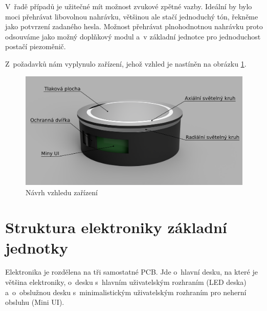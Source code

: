 V~řadě případů je užitečné mít možnost zvukové zpětné vazby.
Ideální by bylo moci přehrávat libovolnou nahrávku, většinou ale stačí jednoduchý tón, řekněme jako potvrzení zadaného hesla.
Možnost přehrávat plnohodnotnou nahrávku proto odsouváme jako možný doplňkový modul a~v základní jednotce pro jednoduchost postačí piezoměnič.

Z~požadavků nám vyplynulo zařízení, jehož vzhled je nastíněn na obrázku \ref{fig:AHS-nacrt}.
\begin{figure}
    \centering
    \includegraphics[width=\textwidth]{text/PraktickaCast/img/AHS-nacrt.png}
    \caption{Návrh vzhledu zařízení}
    \label{fig:AHS-nacrt}
\end{figure}


\section{Struktura elektroniky základní jednotky}

Elektronika je rozdělena na tři samostatné PCB.
Jde o~hlavní desku, na které je většina elektroniky, o~desku s~hlavním uživatelským rozhraním (LED deska) a~o~obslužnou desku s~minimalistickým uživatelským rozhraním pro neherní obsluhu (Mini UI).

